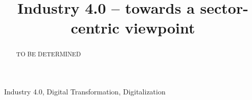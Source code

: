 


\title{Industry 4.0 – towards a sector-centric viewpoint}

\author{
	\and
}

\maketitle
\thispagestyle{plain}
\pagestyle{plain}


\begin{abstract}%
TO BE DETERMINED
\end{abstract}

\begin{IEEEkeywords}
Industry 4.0, Digital Transformation, Digitalization
\end{IEEEkeywords}






\begingroup
\def\UrlBreaks{\do\/\do-}


\endgroup

